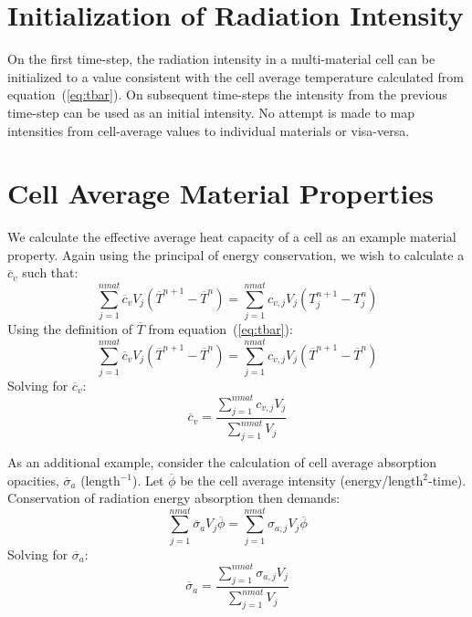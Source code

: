 \documentclass[12pt]{article}
\begin{document}
\section{Initialization of Radiation Intensity}

On the first time-step, the radiation intensity in a multi-material cell
can be initialized to a value consistent
with the cell average temperature calculated from equation~(\ref{eq:tbar}).
 On subsequent time-steps the intensity
from the previous time-step can be used as an initial intensity.
No attempt is made to map intensities from cell-average values to
individual materials or visa-versa.

\section{Cell Average Material Properties}

We calculate the effective average heat capacity of a cell as an example
material property. Again using the principal of energy conservation, 
we wish to calculate a $\overline{c}_{v}$ such that:
\begin{equation}
\sum_{j=1}^{nmat} \overline{c}_{v}  V_{j} 
(\overline{T}^{n+1}-\overline{T}^{n})   = 
\sum_{j=1}^{nmat} c_{v,j} V_{j} (T_{j}^{n+1}-T_{j}^{n})
\end{equation}
Using the definition of $\overline{T}$ from equation~(\ref{eq:tbar}):
\begin{equation}
\sum_{j=1}^{nmat}  \overline{c}_{v} V_{j}  
(\overline{T}^{n+1}-\overline{T}^{n})   = 
 \sum_{j=1}^{nmat} c_{v,j} V_{j} (\overline{T}^{n+1}-\overline{T}^{n})
\end{equation}
Solving for $\overline{c}_{v}$:
\begin{equation}
\overline{c}_{v} = \frac{ \sum_{j=1}^{nmat} c_{v,j} V_{j} } 
{\sum_{j=1}^{nmat} V_{j}}
\label{eq:cvbar}
\end{equation}


As an additional example, consider the calculation of cell average absorption
opacities, $\overline{\sigma}_a$ (length$^{-1}$).
 Let $\overline{\phi}$ be the cell 
average intensity (energy/length$^2$-time). Conservation of radiation
energy absorption then demands:
\begin{equation}
 \sum_{j=1}^{nmat} \overline{\sigma}_a V_j \overline{\phi} =
\sum_{j=1}^{nmat} \sigma_{a,j} V_j \overline{\phi}
\end{equation}
Solving for $\overline{\sigma}_a$:
\begin{equation}
\overline{\sigma}_{a} = \frac{ \sum_{j=1}^{nmat} \sigma_{a,j} V_{j} } 
{\sum_{j=1}^{nmat} V_{j}}
\end{equation}
\end{document}
